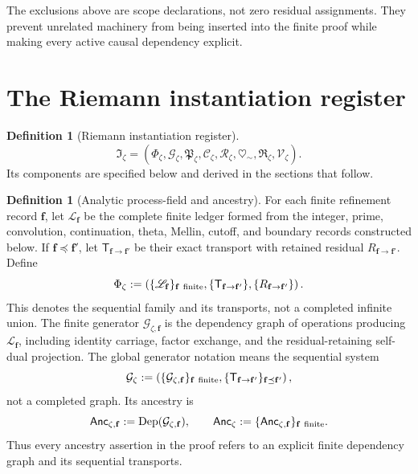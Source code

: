 \documentclass[11pt,a4paper]{article}
\theoremstyle{definition}
\newtheorem{definition}[theorem]{Definition}
\newcommand{\Field}{\Phi}
\newcommand{\Gen}{\mathcal{G}}
\newcommand{\Proj}{\mathfrak{P}}
\newcommand{\Residual}{\mathfrak{R}}
\newcommand{\Validation}{\mathcal{V}}
\newcommand{\heartsim}{\heartsuit_{\sim}}
\newcommand{\Cctx}{\mathcal{C}}
\newcommand{\Rres}{\mathcal{R}}
\newcommand{\RiemannRegister}{\mathfrak{I}_{\zeta}}
\begin{document}
The exclusions above are scope declarations, not zero residual assignments.
They prevent unrelated machinery from being inserted into the finite proof
while making every active causal dependency explicit.

\section{The Riemann instantiation register}
\label{sec:instantiation-register}

\begin{definition}[Riemann instantiation register]
\[
  \RiemannRegister
  =(\Field_{\zeta},\Gen_{\zeta},\Proj_{\zeta},
    \Cctx_{\zeta},\Rres_{\zeta},
    \heartsim,\Residual_{\zeta},\Validation_{\zeta}).
\]
Its components are specified below and derived in the sections that follow.
\end{definition}

\begin{definition}[Analytic process-field and ancestry]
\label{def:riemann-process-field}
For each finite refinement record $\mathbf f$, let $\mathscr L_{\mathbf f}$
be the complete finite ledger formed from the integer, prime, convolution,
continuation, theta, Mellin, cutoff, and boundary records constructed below.
If $\mathbf f\preceq\mathbf f'$, let
$\mathsf T_{\mathbf f\to\mathbf f'}$ be their exact transport with retained
residual $R_{\mathbf f\to\mathbf f'}$. Define
\[
  \Field_\zeta
  :=
  \left(
    \{\mathscr L_{\mathbf f}\}_{\mathbf f\ {\rm finite}},
    \{\mathsf T_{\mathbf f\to\mathbf f'}\},
    \{R_{\mathbf f\to\mathbf f'}\}
  \right).
\]
This denotes the sequential family and its transports, not a completed
infinite union. The finite generator
$\Gen_{\zeta,\mathbf f}$ is the dependency graph of operations producing
$\mathscr L_{\mathbf f}$, including identity carriage, factor exchange, and
the residual-retaining self-dual projection. The global generator notation
means the sequential system
\[
  \Gen_\zeta
  :=
  \left(
    \{\Gen_{\zeta,\mathbf f}\}_{\mathbf f\ {\rm finite}},
    \{\mathsf T_{\mathbf f\to\mathbf f'}\}_{\mathbf f\preceq\mathbf f'}
  \right),
\]
not a completed graph. Its ancestry is
\[
  \mathsf{Anc}_{\zeta,\mathbf f}
  :=
  \operatorname{Dep}(\Gen_{\zeta,\mathbf f}),
  \qquad
  \mathsf{Anc}_\zeta
  :=
  \{\mathsf{Anc}_{\zeta,\mathbf f}\}_{\mathbf f\ {\rm finite}}.
\]
Thus every ancestry assertion in the proof refers to an explicit finite
dependency graph and its sequential transports.
\end{definition}
\end{document}
